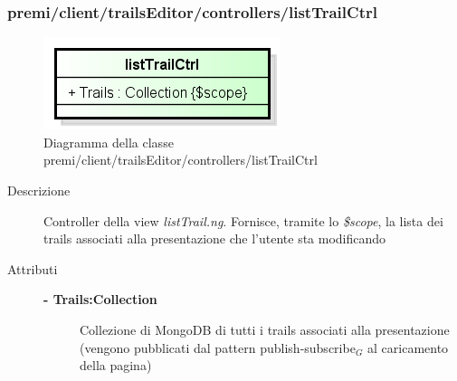\subsubsection{premi/client/trailsEditor/controllers/listTrailCtrl}
\begin{figure}[H]
\begin{center}
\includegraphics[scale=0.95]{img/diacla/listTrailCtrl.png}
\caption{Diagramma della classe premi/client/trailsEditor/controllers/listTrailCtrl}
\end{center}
\end{figure}


\begin{description}
\item[Descrizione] \hfill
	Controller della view \textit{listTrail.ng}. Fornisce, tramite lo \textit{\$scope}, la lista dei trails associati alla presentazione che l'utente sta modificando
	
	
\item[Attributi] \hfill
	\begin{description}
		\item[\textbf{- Trails:Collection			}] \hfill
			Collezione di MongoDB di tutti i trails associati alla presentazione (vengono pubblicati dal pattern publish-subscribe$_G$ al caricamento della pagina)	
	\end{description}
\end{description}








